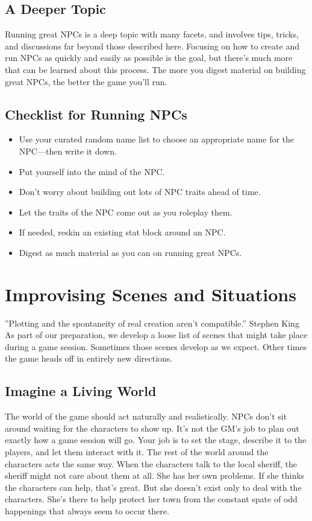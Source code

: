 \documentclass[10pt,a4paper,twoside,bg=print,twocolumn,openany,nodeprecatedcode]{dndbook}
\begin{document}
\subsection{A Deeper Topic}
Running great NPCs is a deep topic with many facets, and involves tips, tricks, and discussions far beyond those described here. Focusing on how to create and run NPCs as quickly and easily as possible is the goal, but there's much more that can be learned about this process. The more you digest material on building great NPCs, the better the game you'll run.
\subsection{Checklist for Running NPCs}

\begin{itemize}
\item Use your curated random name list to choose an appropriate name for the NPC—then write it down.
\item Put yourself into the mind of the NPC.
\item Don't worry about building out lots of NPC traits ahead of time.
\item Let the traits of the NPC come out as you roleplay them.
\item If needed, reskin an existing stat block around an NPC.
\item Digest as much material as you can on running great NPCs.
\end{itemize}

\section{Improvising Scenes and Situations}
\DndQuote%
{}
{''Plotting and the spontaneity of real creation aren't compatible.''}
{Stephen King}
As part of our preparation, we develop a loose list of scenes that might take place during a game session. Sometimes those scenes develop as we expect. Other times the game heads off in entirely new directions.
\subsection{Imagine a Living World}
The world of the game should act naturally and realistically. NPCs don't sit around waiting for the characters to show up. It's not the GM's job to plan out exactly how a game session will go. Your job is to set the stage, describe it to the players, and let them interact with it.
The rest of the world around the characters acts the same way. When the characters talk to the local sheriff, the sheriff might not care about them at all. She has her own problems. If she thinks the characters can help, that's great. But she doesn't exist only to deal with the characters. She's there to help protect her town from the constant spate of odd happenings that always seem to occur there.
\end{document}
